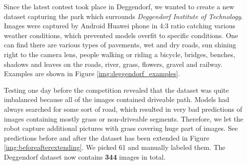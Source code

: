 Since the latest contest took place in Deggendorf, we wanted to create a new dataset
capturing the park which surrounds \textit{Deggendorf Institute of Technology}.
Images were captured by
Android Huawei phone in 4:3 ratio catching various weather conditions, which prevented models
overfit to specific conditions.
One can find there are various types of pavements, wet and dry roads, sun shining right to the
camera lens, people walking or riding a bicycle, bridges, benches, shadows and leaves on
the roads, river, grass, flowers, gravel and railway. Examples are shown in Figure
\ref{img:deggendorf_examples}.

Testing one day before the competition
revealed that the dataset was quite imbalanced because all of the images contained driveable
path. Models had always searched for some sort of road, which resulted in very bad
predictions of images containing mostly grass or non-driveable segments. Therefore, we let
the robot capture additional pictures with grass covering huge part of images.
See predictions before and after the dataset has been extended in Figure
\ref{img:beforeafterextending}. We picked 61 and manually labeled them.
The Deggendorf dataset now contains \textbf{344} images in total.

